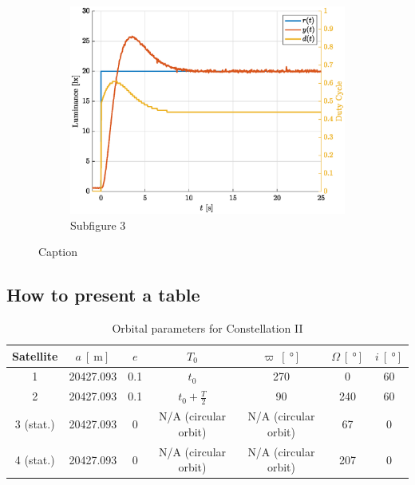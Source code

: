 \documentclass[12pt]{article}
\begin{document}
\begin{figure}[H]
\begin{subfigure}{0.33\textwidth}
        \label{fig:2.2}
    \end{subfigure}%
    \begin{subfigure}{0.33\textwidth}
        \includegraphics[width=\linewidth]{Images/Subimage3.eps}
        \caption{Subfigure 3}
        \label{fig:2.3}
    \end{subfigure}
    \caption{Caption}
    \label{fig:2}
\end{figure}

\subsection{How to present a table}

\begin{table}[H]
    \centering
    \caption{Orbital parameters for Constellation II}
    \label{tab:1}
    \begin{tabular}{|c|c|c|c|c|c|c|}
        \hline
        Satellite & $a \ [\SI{}{\meter}]$ & $e$  & $T_0$                 & $\varpi \ [\SI{}{\degree}]$ & $\Omega \ [\SI{}{\degree}]$ & $i \ [\SI{}{\degree}]$ \\ \hline
        1        & 20427.093             & 0.1 & $t_0$                 & 270                          & 0         & 60    \\ \hline
        2        & 20427.093             & 0.1 & $t_0 + \frac{T}{2}$   & 90                           & 240       & 60    \\ \hline
        3 (stat.) & 20427.093             & 0 &  N/A (circular orbit)  &  N/A (circular orbit)       & 67        & 0    \\ \hline
        4 (stat.) & 20427.093             & 0    & N/A (circular orbit) & N/A (circular orbit)       & 207       & 0     \\ \hline
    \end{tabular}
\end{table}
\end{document}
